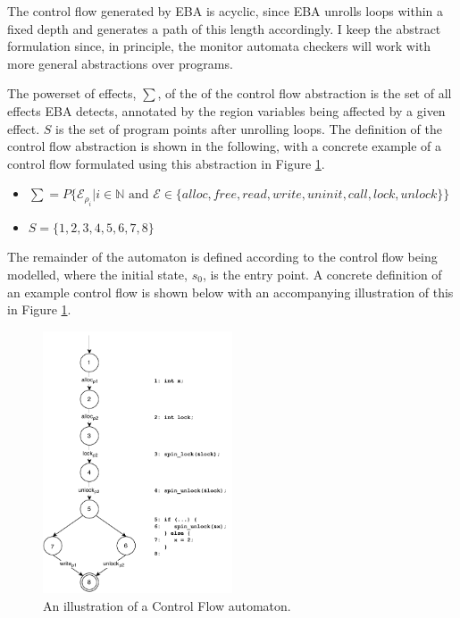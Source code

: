 \newpar The control flow generated by EBA is acyclic, since EBA unrolls loops within a fixed depth and generates a path of this length accordingly. I keep the abstract formulation since, in principle, the monitor automata checkers will work with more general abstractions over programs.

\newpar The powerset of effects, $\sum$, of the of the control flow abstraction is the set of all effects EBA detects, annotated by the region variables being affected by a given effect. $S$ is the set of  program points after unrolling loops. The definition of the control flow abstraction is shown in the following, with a concrete example of a control flow formulated using this abstraction in Figure \ref{cfg_example-automaton}. 

\begin{itemize}
    \item $\sum = P\{ \mathcal{E}_{\rho_i} | i \in \mathbb{N} \text{ and } \mathcal{E} \in \{ alloc, free, read, write, uninit, call, lock, unlock\}\}$
    \item $S = \{1, 2, 3, 4, 5, 6, 7, 8\}$
\end{itemize}

\noindent The remainder of the automaton is defined according to the control flow being modelled, where the initial state, $s_0$, is the entry point. A concrete definition of an example control flow is shown below with an accompanying illustration of this in Figure \ref{cfg_example-automaton}.

\begin{figure}[H]
    \centering
    \includegraphics[width=0.5\textwidth]{algorithm/figures/cfg_example}
    \caption{An illustration of a Control Flow automaton.}
    \label{cfg_example-automaton}
\end{figure}

